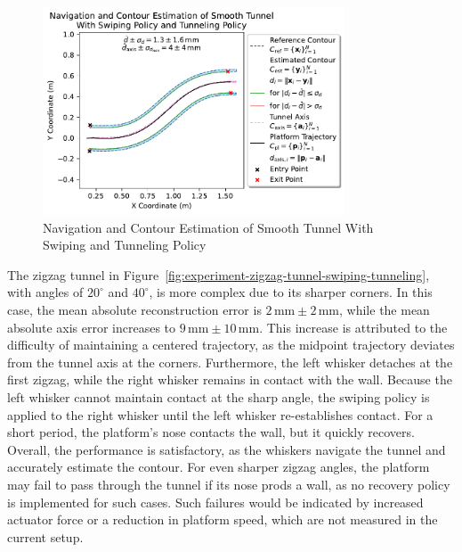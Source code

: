\begin{figure}[!htb]
    \centering
    \includegraphics[width=0.8\textwidth]{figures/experiments/smooth-tunnel-swiping-tunneling}
    \caption{Navigation and Contour Estimation of Smooth Tunnel With Swiping and Tunneling Policy}
    \label{fig:experiment-smooth-tunnel-swiping-tunneling}
\end{figure}

The zigzag tunnel in Figure~\ref{fig:experiment-zigzag-tunnel-swiping-tunneling}, with angles of $20^\circ$ and $40^\circ$, is more complex due to its sharper corners.
In this case, the mean absolute reconstruction error is $2\,\text{mm} \pm 2\,\text{mm}$, while the mean absolute axis error increases to $9\,\text{mm} \pm 10\,\text{mm}$.
This increase is attributed to the difficulty of maintaining a centered trajectory, as the midpoint trajectory deviates from the tunnel axis at the corners.
Furthermore, the left whisker detaches at the first zigzag, while the right whisker remains in contact with the wall.
Because the left whisker cannot maintain contact at the sharp angle, the swiping policy is applied to the right whisker until the left whisker re-establishes contact.
For a short period, the platform’s nose contacts the wall, but it quickly recovers.
Overall, the performance is satisfactory, as the whiskers navigate the tunnel and accurately estimate the contour.
For even sharper zigzag angles, the platform may fail to pass through the tunnel if its nose prods a wall, as no recovery policy is implemented for such cases.
Such failures would be indicated by increased actuator force or a reduction in platform speed, which are not measured in the current setup.

